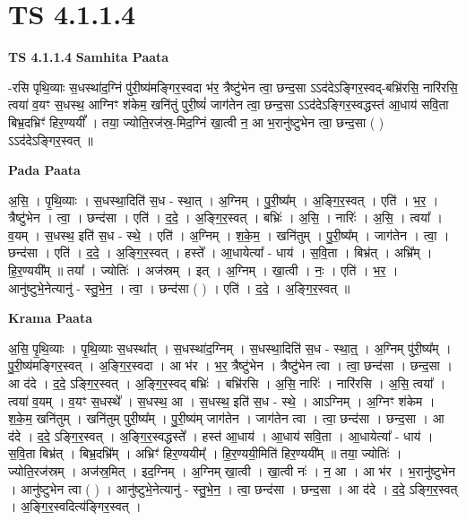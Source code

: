 \documentclass[17pt]{extarticle}
\begin{document}
\section{ TS 4.1.1.4 }

\textbf{TS 4.1.1.4 } \newline
\textbf{Samhita Paata} \newline

-रसि पृथि॒व्याः स॒धस्था॑द॒ग्निं पु॑री॒ष्य॑मङ्गिर॒स्वदा भ॑र॒ त्रैष्टु॑भेन त्वा॒ छन्द॒सा ऽऽद॑देऽङ्गिर॒स्वद्-बभ्रि॑रसि॒ नारि॑रसि॒ त्वया॑ व॒यꣳ स॒धस्थ॒ आग्निꣳ श॑केम॒ खनि॑तुं पुरी॒ष्यं॑ जाग॑तेन त्वा॒ छन्द॒सा ऽऽद॑देऽङ्गिर॒स्वद्धस्त॑ आ॒धाय॑ सवि॒ता बिभ्र॒दभ्रिꣳ॑ हिर॒ण्ययीं᳚ । तया॒ ज्योति॒रज॑स्र॒-मिद॒ग्निं खा॒त्वी न॒ आ भ॒रानु॑ष्टुभेन त्वा॒ छन्द॒सा ( ) ऽऽद॑देऽङ्गिर॒स्वत् ॥ \newline

\textbf{Pada Paata} \newline

अ॒सि॒ । पृ॒थि॒व्याः । स॒धस्था॒दिति॑ स॒ध - स्था॒त् । अ॒ग्निम् । पु॒री॒ष्य᳚म् । अ॒ङ्गि॒र॒स्वत् । एति॑ । भ॒र॒ । त्रैष्टु॑भेन । त्वा॒ । छन्द॑सा । एति॑ । द॒दे॒ । अ॒ङ्गि॒र॒स्वत् । बभ्रिः॑ । अ॒सि॒ । नारिः॑ । अ॒सि॒ । त्वया᳚ । व॒यम् । स॒धस्थ॒ इति॑ स॒ध - स्थे॒ । एति॑ । अ॒ग्निम् । श॒के॒म॒ । खनि॑तुम् । पु॒री॒ष्य᳚म् । जाग॑तेन । त्वा॒ । छन्द॑सा । एति॑ । द॒दे॒ । अ॒ङ्गि॒र॒स्वत् । हस्ते᳚ । आ॒धायेत्या᳚ - धाय॑ । स॒वि॒ता । बिभ्र॑त् । अभ्रि᳚म् । हि॒र॒ण्ययी᳚म् ॥ तया᳚ । ज्योतिः॑ । अज॑स्रम् । इत् । अ॒ग्निम् । खा॒त्वी । नः॒ । एति॑ । भ॒र॒ । आनु॑ष्टुभे॒नेत्यानु॑ - स्तु॒भे॒न॒ । त्वा॒ । छन्द॑सा ( ) । एति॑ । द॒दे॒ । अ॒ङ्गि॒र॒स्वत् ॥  \newline


\textbf{Krama Paata} \newline

अ॒सि॒ पृ॒थि॒व्याः । पृ॒थि॒व्याः स॒धस्था᳚त् । स॒धस्था॑द॒ग्निम् । स॒धस्था॒दिति॑ स॒ध - स्था॒त्॒ । अ॒ग्निम् पु॑री॒ष्य᳚म् । पु॒री॒ष्य॑मङ्गिर॒स्वत् । अ॒ङ्गि॒र॒स्वदा । आ भ॑र । भ॒र॒ त्रैष्टु॑भेन । त्रैष्टु॑भेन त्वा । त्वा॒ छन्द॑सा । छन्द॒सा । आ द॑दे । द॒दे॒ ऽङ्गि॒र॒स्वत् । अ॒ङ्गि॒र॒स्वद् बभ्रिः॑ । बभ्रि॑रसि । अ॒सि॒ नारिः॑ । नारि॑रसि । अ॒सि॒ त्वया᳚ । त्वया॑ व॒यम् । व॒यꣳ स॒धस्थे᳚ । स॒धस्थ॒ आ । स॒धस्थ॒ इति॑ स॒ध - स्थे॒ । आऽग्निम् । अ॒ग्निꣳ श॑केम । श॒के॒म॒ खनि॑तुम् । खनि॑तुम् पुरी॒ष्य᳚म् । पु॒री॒ष्य॑म् जाग॑तेन । जाग॑तेन त्वा । त्वा॒ छन्द॑सा । छन्द॒सा । आ द॑दे । द॒दे॒ ऽङ्गि॒र॒स्वत् । अ॒ङ्गि॒र॒स्वद्धस्ते᳚ । हस्त॑ आ॒धाय॑ । आ॒धाय॑ सवि॒ता । आ॒धायेत्या᳚ - धाय॑ । स॒वि॒ता बिभ्र॑त् । बिभ्र॒दभ्रि᳚म् । अभ्रिꣳ॑ हिर॒ण्ययीम्᳚ । हि॒र॒ण्ययी॒मिति॑ हिर॒ण्ययी᳚म् ॥ तया॒ ज्योतिः॑ । ज्योति॒रज॑स्रम् । अज॑स्र॒मित् । इद॒ग्निम् । अ॒ग्निम् खा॒त्वी । खा॒त्वी नः॑ । न॒ आ । आ भ॑र । भ॒रानु॑ष्टुभेन । आनु॑ष्टुभेन त्वा ( ) । आनु॑ष्टुभे॒नेत्यानु॑ - स्तु॒भे॒न॒ । त्वा॒ छन्द॑सा । छन्द॒सा । आ द॑दे । द॒दे॒ ऽङ्गि॒र॒स्वत् । अ॒ङ्गि॒र॒स्वदित्य॑ङ्गिर॒स्वत् । \newline
\end{document}
